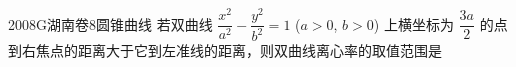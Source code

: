 
\begin{problem}{2008}{G}{湖南卷}{8}{圆锥曲线}
若双曲线 $\dfrac{x^2}{a^2}-\dfrac{y^2}{b^2}=1$ ($a>0$, $b>0$) 上横坐标为 $\dfrac{3a}{2}$ 的点到右焦点的距离大于它到左准线的距离，则双曲线离心率的取值范围是
\begin{choices}
\end{choices}
\end{problem}

\begin{answer}

\end{answer}

\begin{solutions}

\end{solutions}